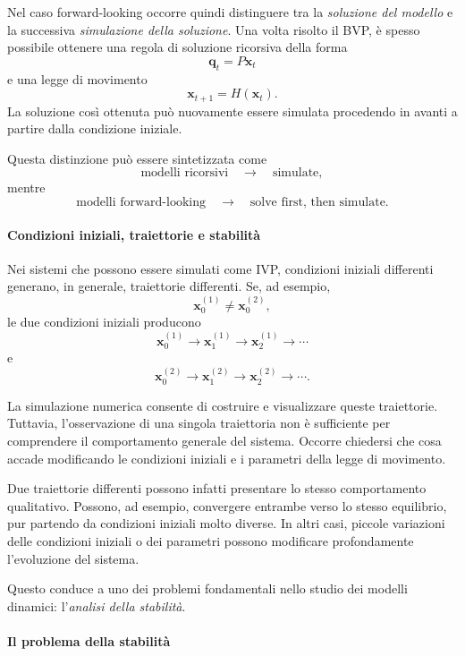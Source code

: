 \documentclass{book}
\begin{document}
Nel caso forward-looking occorre quindi distinguere tra la
\emph{soluzione del modello} e la successiva \emph{simulazione della
soluzione}. Una volta risolto il BVP, è spesso possibile ottenere una
regola di soluzione ricorsiva della forma
\[
\mathbf{q}_t=P\mathbf{x}_t
\]
e una legge di movimento
\[
\mathbf{x}_{t+1}=H(\mathbf{x}_t).
\]
La soluzione così ottenuta può nuovamente essere simulata procedendo in
avanti a partire dalla condizione iniziale.

Questa distinzione può essere sintetizzata come
\[
\text{modelli ricorsivi}
\quad\longrightarrow\quad
\text{simulate},
\]
mentre
\[
\text{modelli forward-looking}
\quad\longrightarrow\quad
\text{solve first, then simulate}.
\]


\paragraph{Condizioni iniziali, traiettorie e stabilità}

Nei sistemi che possono essere simulati come IVP, condizioni iniziali
differenti generano, in generale, traiettorie differenti. Se, ad esempio,
\[
\mathbf{x}_0^{(1)}\neq\mathbf{x}_0^{(2)},
\]
le due condizioni iniziali producono
\[
\mathbf{x}_0^{(1)}
\rightarrow
\mathbf{x}_1^{(1)}
\rightarrow
\mathbf{x}_2^{(1)}
\rightarrow\cdots
\]
e
\[
\mathbf{x}_0^{(2)}
\rightarrow
\mathbf{x}_1^{(2)}
\rightarrow
\mathbf{x}_2^{(2)}
\rightarrow\cdots.
\]

La simulazione numerica consente di costruire e visualizzare queste
traiettorie. Tuttavia, l'osservazione di una singola traiettoria non è
sufficiente per comprendere il comportamento generale del sistema.
Occorre chiedersi che cosa accade modificando le condizioni iniziali
e i parametri della legge di movimento.

Due traiettorie differenti possono infatti presentare lo stesso
comportamento qualitativo. Possono, ad esempio, convergere entrambe
verso lo stesso equilibrio, pur partendo da condizioni iniziali molto
diverse. In altri casi, piccole variazioni delle condizioni iniziali o
dei parametri possono modificare profondamente l'evoluzione del
sistema.

Questo conduce a uno dei problemi fondamentali nello studio dei
modelli dinamici: l'\emph{analisi della stabilità}.


\paragraph{Il problema della stabilità}
\end{document}
